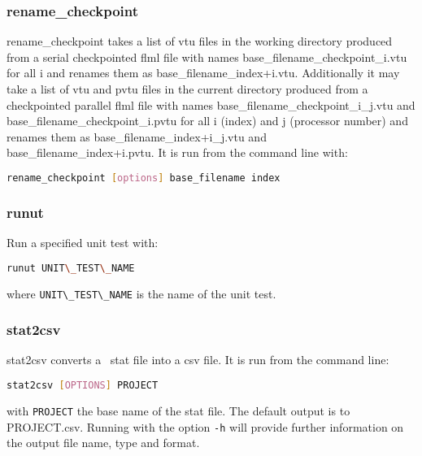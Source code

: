 \subsubsection{rename\_checkpoint}
\label{sec:rename_checkpoint}
rename\_checkpoint takes a list of vtu files in the working directory produced from a serial checkpointed flml file with names base\_filename\_checkpoint\_i.vtu for all i and renames them as base\_filename\_index+i.vtu. Additionally it may take a list of
vtu and pvtu files in the current directory produced from a checkpointed parallel flml file with names base\_filename\_checkpoint\_i\_j.vtu and base\_filename\_checkpoint\_i.pvtu for all i (index) and j (processor number) and renames them as base\_filename\_index+i\_j.vtu and base\_filename\_index+i.pvtu. It is run from the command line with:
\begin{lstlisting}[language = Bash]
rename_checkpoint [options] base_filename index
\end{lstlisting}


\subsubsection{runut}
\label{sec:runut}
Run a specified unit test with:
\begin{lstlisting}[language = Bash]
runut UNIT\_TEST\_NAME
\end{lstlisting} 
where \lstinline[language = Bash]+UNIT\_TEST\_NAME+ is the name of the unit test.


\subsubsection{stat2csv}
\label{sec:stat2csv}
stat2csv converts a \fluidity\ stat file into a csv file. It is run from the command line:
\begin{lstlisting}[language = Bash]
stat2csv [OPTIONS] PROJECT
\end{lstlisting} 
with \lstinline[language = Bash]+PROJECT+ the base name of the stat file. The default output is to PROJECT.csv. Running with the option \lstinline[language = Bash]+-h+ will provide further information on the output file name, type and format.


